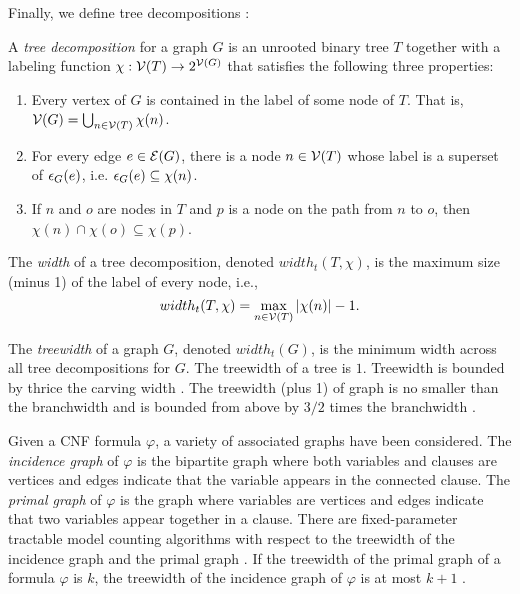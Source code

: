 Finally, we define tree decompositions \cite{RS91}:
\begin{definition}
	A \emph{tree decomposition} for a graph $G$ is an unrooted binary tree $T$ together with a labeling function $\chi : \mathcal{V}(T) \rightarrow 2^{\mathcal{V}(G)}$ that satisfies the following three properties:
	\begin{enumerate}
		\item Every vertex of $G$ is contained in the label of some node of $T$. That is, $\mathcal{V}(G) = \bigcup_{n \in \mathcal{V}(T)} \chi(n)$.
		\item For every edge $e \in \mathcal{E}(G)$, there is a node $n \in \mathcal{V}(T)$ whose label is a superset of $\epsilon_{G}(e)$, i.e. $\epsilon_{G}(e) \subseteq \chi(n)$.
		\item If $n$ and $o$ are nodes in $T$ and $p$ is a node on the path from $n$ to $o$, then $\chi(n) \cap \chi(o) \subseteq \chi(p)$.
	\end{enumerate}
	The \emph{width} of a tree decomposition, denoted $width_t(T, \chi)$, is the maximum size (minus 1) of the label of every node, i.e.,
	$$width_t(T, \chi) = \max_{n \in \mathcal{V}(T)} | \chi(n) | - 1.$$
\end{definition}

The \emph{treewidth} of a graph $G$, denoted $width_t(G)$, is the minimum width across all tree decompositions for $G$. The treewidth of a tree is $1$. Treewidth is bounded by thrice the carving width \cite{sasak10}. The treewidth (plus 1) of graph is no smaller than the branchwidth and is bounded from above by $3/2$ times the branchwidth \cite{RS91}. 

Given a CNF formula $\varphi$, a variety of associated graphs have been considered. The \emph{incidence graph} of $\varphi$ is the bipartite graph where both variables and clauses are vertices and edges indicate that the variable appears in the connected clause. The \emph{primal graph} of $\varphi$ is the graph where variables are vertices and edges indicate that two variables appear together in a clause. There are fixed-parameter tractable model counting algorithms with respect to the treewidth of the incidence graph and the primal graph \cite{SS10}. If the treewidth of the primal graph of a formula $\varphi$ is $k$, the treewidth of the incidence graph of $\varphi$ is at most $k+1$ \cite{KV00}.
